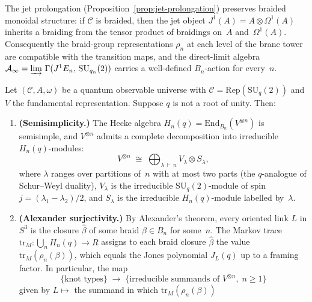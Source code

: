 \begin{remark}
\label{rem:braid-lifting-compatibility}
The jet prolongation (Proposition~\ref{prop:jet-prolongation}) preserves
braided monoidal structure: if $\mathcal{C}$ is braided, then the jet
object $J^1(A) = A \otimes \Omega^1(A)$ inherits a braiding from the
tensor product of braidings on~$A$ and~$\Omega^1(A)$.  Consequently the
braid-group representations $\rho_n$ at each level of the brane tower are
compatible with the transition maps, and the direct-limit algebra
$\mathcal{A}_\infty = \varinjlim\,\Gamma(J^1 E_n,\,
\mathrm{SU}_{q_n}(2))$ carries a well-defined $B_n$-action for
every~$n$.
\end{remark}

\begin{proposition}
\label{prop:knot-eigenbasis-complete}
\leanok
Let $(\mathcal{C}, A, \omega)$ be a quantum observable universe with
$\mathcal{C} = \mathrm{Rep}(\mathrm{SU}_q(2))$ and $V$ the fundamental
representation.  Suppose $q$ is not a root of unity.  Then:
\begin{enumerate}
  \item \textbf{(Semisimplicity.)}  The Hecke algebra
    $H_n(q) = \mathrm{End}_{B_n}(V^{\otimes n})$ is semisimple, and
    $V^{\otimes n}$ admits a complete decomposition into irreducible
    $H_n(q)$-modules:
    \[
      V^{\otimes n}
      \;\cong\;
      \bigoplus_{\lambda \,\vdash\, n}
      V_\lambda \otimes S_\lambda,
    \]
    where $\lambda$ ranges over partitions of~$n$ with at most two parts
    (the $q$-analogue of Schur--Weyl duality), $V_\lambda$ is the
    irreducible $\mathrm{SU}_q(2)$-module of spin
    $j = (\lambda_1 - \lambda_2)/2$, and $S_\lambda$ is the irreducible
    $H_n(q)$-module labelled by~$\lambda$.
  \item \textbf{(Alexander surjectivity.)}  By Alexander's theorem, every
    oriented link $L$ in $S^3$ is the closure $\hat{\beta}$ of some braid
    $\beta \in B_n$ for some~$n$.  The Markov trace
    $\mathrm{tr}_M \colon \bigcup_n H_n(q) \to R$ assigns to each braid
    closure $\hat{\beta}$ the value
    $\mathrm{tr}_M(\rho_n(\beta))$, which equals the Jones polynomial
    $J_L(q)$ up to a framing factor.  In particular, the map
    \[
      \{\text{knot types}\}
      \;\longrightarrow\;
      \{\text{irreducible summands of } V^{\otimes n},\; n \geq 1\}
    \]
    given by $L \mapsto$ the summand in which $\mathrm{tr}_M(\rho_n(\beta))$

\end{enumerate}
\end{proposition}
